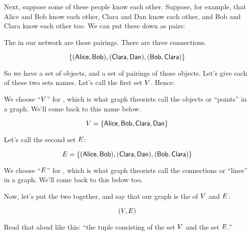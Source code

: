 \documentclass[../../../main.tex]{subfiles}
\begin{document}
Next, suppose some of these people know each other. Suppose, for example, that Alice and Bob know each other, Clara and Dan know each other, and Bob and Clara know each other too. We can put these down as pairs:

\begin{aside}
  \begin{remark}
    The  in our network are these pairings. There are three connections.
  \end{remark}
\end{aside}

\begin{equation*}
  \{ (\mathsf{Alice}, \mathsf{Bob}), (\mathsf{Clara}, \mathsf{Dan}), (\mathsf{Bob}, \mathsf{Clara}) \}
\end{equation*}

So we have a set of objects, and a set of pairings of those objects. Let's give each of these two sets names. Let's call the first set $V$. Hence:

\begin{terminology}
  We choose ``$V$'' for , which is what graph theorists call the objects or ``points'' in a graph. We'll come back to this name below.
\end{terminology}

\begin{equation*}
  V = \{ \mathsf{Alice}, \mathsf{Bob}, \mathsf{Clara}, \mathsf{Dan} \}
\end{equation*}

Let's call the second set $E$:

\begin{equation*}
  E = \{ (\mathsf{Alice}, \mathsf{Bob}), (\mathsf{Clara}, \mathsf{Dan}), (\mathsf{Bob}, \mathsf{Clara}) \}
\end{equation*}%
%
\begin{terminology}%
  We choose ``$E$'' for , which is what graph theorists call the connections or ``lines'' in a graph. We'll come back to this below too.
\end{terminology}

Now, let's put the two together, and say that our graph is the  of $V$ and $E$:

\begin{equation*}
  (V, E)
\end{equation*}

Read that aloud like this: ``the tuple consisting of the set $V$ and the set $E$.''
\end{document}

